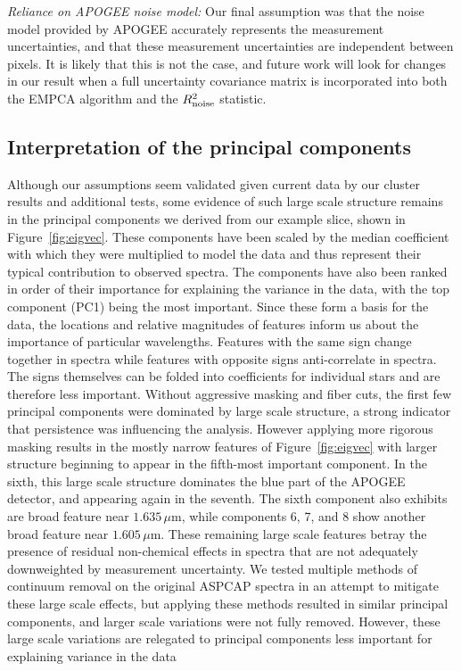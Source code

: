 \documentclass[a4paper,fleqn,usenatbib]{mnras}
\begin{document}
\textit{Reliance on APOGEE noise model:} Our final assumption was that the noise model provided by APOGEE accurately represents the measurement uncertainties, and that these measurement uncertainties are independent between pixels. It is likely that this is not the case, and future work will look for changes in our result when a full uncertainty covariance matrix is incorporated into both the EMPCA algorithm and the $R^2_{\rm noise}$ statistic.

\subsection{Interpretation of the principal components}

Although our assumptions seem validated given current data by our cluster results and additional tests, some evidence of such large scale structure remains in the principal components we derived from our example slice, shown in Figure~\ref{fig:eigvec}. These components have been scaled by the median coefficient with which they were multiplied to model the data and thus represent their typical contribution to observed spectra. The components have also been ranked in order of their importance for explaining the variance in the data, with the top component (PC1) being the most important. Since these form a basis for the data, the locations and relative magnitudes of features inform us about the importance of particular wavelengths. Features with the same sign change together in spectra while features with opposite signs anti-correlate in spectra. The signs themselves can be folded into coefficients for individual stars and are therefore less important. Without aggressive masking and fiber cuts, the first few principal components were dominated by large scale structure, a strong indicator that persistence was influencing the analysis. However applying more rigorous masking results in the mostly narrow features of Figure~\ref{fig:eigvec} with larger structure beginning to appear in the fifth-most important component. In the sixth, this large scale structure dominates the blue part of the APOGEE detector, and appearing again in the seventh. The sixth component also exhibits are broad feature near $1.635\,\mu$m, while components 6, 7, and 8 show another broad feature near $1.605\,\mu$m. These remaining large scale features betray the presence of residual non-chemical effects in spectra that are not adequately downweighted by measurement uncertainty. We tested multiple methods of continuum removal on the original ASPCAP spectra in an attempt to mitigate these large scale effects, but applying these methods resulted in similar principal components, and larger scale variations were not fully removed. However, these large scale variations are relegated to principal components less important for explaining variance in the data
\end{document}

